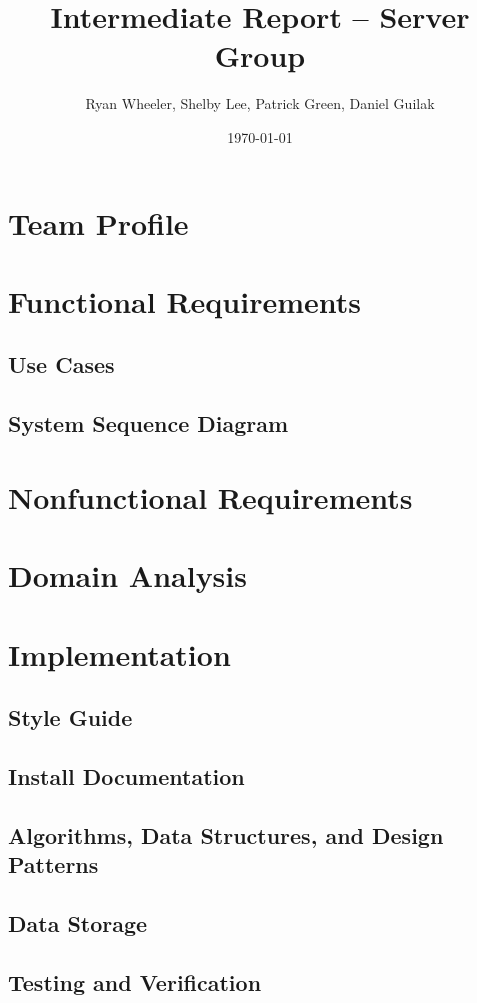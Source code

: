 \documentclass[letterpaper,12pt]{article}
\begin{document}
\title{Intermediate Report -- Server Group}
\author{Ryan Wheeler, Shelby Lee, Patrick Green, Daniel Guilak}
\date{\today}
\maketitle

\tableofcontents

\section{Team Profile}

\section{Functional Requirements}
\subsection{Use Cases}
\subsection{System Sequence Diagram}
\section{Nonfunctional Requirements}
\section{Domain Analysis}
\section{Implementation}
\subsection{Style Guide}
\subsection{Install Documentation}
\subsection{Algorithms, Data Structures, and Design Patterns}
\subsection{Data Storage}
\subsection{Testing and Verification}
\end{document}
